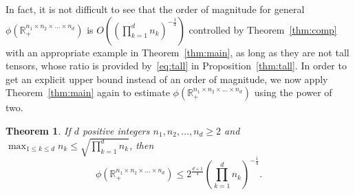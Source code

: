 \documentclass[11pt]{article}
\newtheorem{theorem}{Theorem}[section]
\newcommand{\R}{\mathbb{R}}
\begin{document}
In fact, it is not difficult to see that the order of magnitude for general $\phi(\R_+^{n_1\times n_2\times\dots\times n_d})$ is $O\left(\left(\prod_{k=1}^dn_k\right)^{-\frac{1}{4}}\right)$ controlled by Theorem~\ref{thm:comp} with an appropriate example in Theorem~\ref{thm:main}, as long as they are not tall tensors, whose ratio is provided by~\eqref{eq:tall} in Proposition~\ref{thm:tall}. In order to get an explicit upper bound instead of an order of magnitude, we now apply Theorem~\ref{thm:main} again to estimate $\phi(\R_+^{n_1\times n_2\times\dots\times n_d})$ using the power of two.
\begin{theorem}\label{thm:upper}
  If $d$ positive integers $n_1,n_2,\dots,n_d\ge2$ and
   $\max_{1\le k\le d}n_k\le \sqrt{\prod_{k=1}^dn_k}$,
  then
  \begin{equation}\label{eq:upper2}
    \phi(\R_+^{n_1\times n_2\times\dots\times n_d})
    \le 2^{\frac{d+1}{4}}\left(\prod_{k=1}^d n_k\right)^{-\frac{1}{4}}.
  \end{equation}
\end{theorem}
\end{document}
